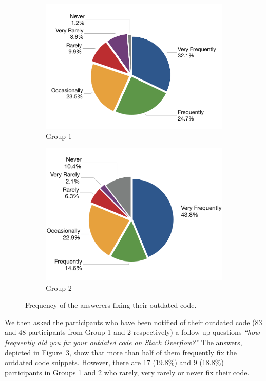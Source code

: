 \documentclass{svjour3}                     %
\begin{document}
\begin{figure}
	\begin{subfigure}{.5\textwidth}
		\centering
		\includegraphics[width=.8\linewidth]{survey_outdated_fix_1}
		\caption{Group 1}
		\label{fig:survey_outdated_fix_1}
	\end{subfigure}%
	\begin{subfigure}{.5\textwidth}
		\centering
		\includegraphics[width=.8\linewidth]{survey_outdated_fix_2}
		\caption{Group 2}
		\label{fig:survey_outdated_fix_2}
	\end{subfigure}
	\caption{Frequency of the answerers fixing their outdated code.}
	\label{fig:survey_outdated_fix}
\end{figure}

We then asked the participants who have been notified of their outdated code (83
and 48 participants from Group 1 and 2 respectively) a follow-up questions
\textit{``how frequently did you fix your outdated code on Stack Overflow?''}
The answers, depicted in Figure~\ref{fig:survey_outdated_fix}, show that more
than half of them frequently fix the outdated code snippets. However, there are
17 (19.8\%) and 9 (18.8\%) participants in Groups 1 and 2 who rarely, very
rarely or never fix their code.
\end{document}
